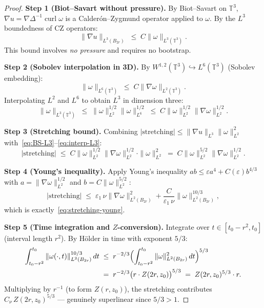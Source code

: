 \documentclass[11pt]{article}
\theoremstyle{definition}
\theoremstyle{remark}
\newcommand{\T}{\mathbb{T}}
\newcommand{\curl}{\operatorname{curl}}
\begin{document}
\begin{proof}
  \textbf{Step 1 (Biot--Savart without pressure).}
  By Biot--Savart on $\T^3$, $\nabla u = \nabla\Delta^{-1}\curl\omega$
  is a Calderón--Zygmund operator applied to $\omega$.  By the $L^3$
  boundedness of CZ operators:
  \begin{equation}\label{eq:BS-L3}
    \|\nabla u\|_{L^3(B_{2r})} \;\leq\; C\|\omega\|_{L^3(\T^3)}.
  \end{equation}
  This bound involves \emph{no pressure} and requires no bootstrap.

  \textbf{Step 2 (Sobolev interpolation in 3D).}
  By $W^{1,2}(\T^3)\hookrightarrow L^6(\T^3)$ (Sobolev embedding):
  \begin{equation}\label{eq:sobolev-L6}
    \|\omega\|_{L^6(\T^3)} \;\leq\; C\|\nabla\omega\|_{L^2(\T^3)}.
  \end{equation}
  Interpolating $L^2$ and $L^6$ to obtain $L^3$ in dimension three:
  \begin{equation}\label{eq:interp-L3}
    \|\omega\|_{L^3(\T^3)}
    \;\leq\; \|\omega\|_{L^2}^{1/2}\|\omega\|_{L^6}^{1/2}
    \;\leq\; C\|\omega\|_{L^2}^{1/2}\|\nabla\omega\|_{L^2}^{1/2}.
  \end{equation}

  \textbf{Step 3 (Stretching bound).}
  Combining $|\text{stretching}|\leq\|\nabla u\|_{L^3}\|\omega\|_{L^2}^2$
  with~\eqref{eq:BS-L3}--\eqref{eq:interp-L3}:
  \begin{equation}\label{eq:stretch-intermediate}
    |\text{stretching}|
    \;\leq\; C\|\omega\|_{L^2}^{1/2}\|\nabla\omega\|_{L^2}^{1/2}\cdot\|\omega\|_{L^2}^2
    \;=\; C\|\omega\|_{L^2}^{5/2}\|\nabla\omega\|_{L^2}^{1/2}.
  \end{equation}

  \textbf{Step 4 (Young's inequality).}
  Apply Young's inequality $ab\leq\varepsilon a^{4}+C(\varepsilon)b^{4/3}$
  with $a = \|\nabla\omega\|_{L^2}^{1/2}$ and $b = C\|\omega\|_{L^2}^{5/2}$:
  \begin{equation}\label{eq:young-applied}
    |\text{stretching}|
    \;\leq\; \varepsilon_1\,\nu\|\nabla\omega\|_{L^2(B_{2r})}^2
    + \frac{C}{\varepsilon_1\,\nu}\|\omega\|_{L^2(B_{2r})}^{10/3},
  \end{equation}
  which is exactly~\eqref{eq:stretching-young}.

  \textbf{Step 5 (Time integration and $Z$-conversion).}
  Integrate over $t\in[t_0-r^2,t_0]$ (interval length $r^2$).
  By Hölder in time with exponent $5/3$:
  \begin{align*}
    \int_{t_0-r^2}^{t_0}\|\omega(\cdot,t)\|_{L^2(B_{2r})}^{10/3}\,dt
    &\;\leq\; r^{-2/3}
      \Bigl(\int_{t_0-r^2}^{t_0}\|\omega\|_{L^2(B_{2r})}^2\,dt\Bigr)^{5/3} \\
    &\;=\; r^{-2/3}\bigl(r\cdot Z(2r,z_0)\bigr)^{5/3}
    \;=\; Z(2r,z_0)^{5/3}\cdot r.
  \end{align*}
  Multiplying by $r^{-1}$ (to form $Z(r,z_0)$), the stretching contributes
  $C_{\nu}\,Z(2r,z_0)^{5/3}$ — genuinely superlinear since $5/3>1$.
\end{proof}
\end{document}
